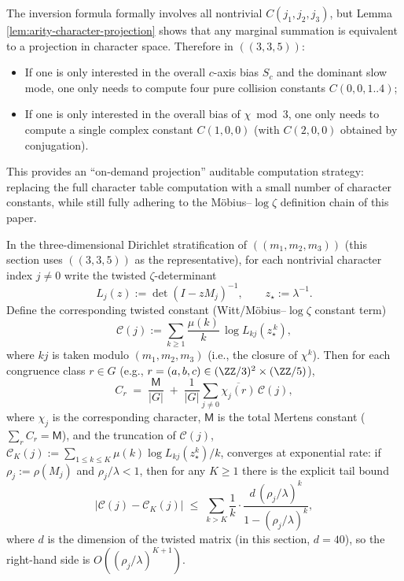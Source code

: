 \begin{remark}\label{rem:arity-335-projection-compression}
The inversion formula formally involves all nontrivial \(C(j_1,j_2,j_3)\), but Lemma \ref{lem:arity-character-projection} shows that any marginal summation is equivalent to a projection in character space.
Therefore in \(((3,3,5))\):
\begin{itemize}
  \item If one is only interested in the overall \(c\)-axis bias \(S_c\) and the dominant slow mode, one only needs to compute four pure collision constants \(C(0,0,1..4)\);
  \item If one is only interested in the overall bias of \(\chi\bmod 3\), one only needs to compute a single complex constant \(C(1,0,0)\) (with \(C(2,0,0)\) obtained by conjugation).
\end{itemize}
This provides an ``on-demand projection'' auditable computation strategy: replacing the full character table computation with a small number of character constants, while still fully adhering to the M\"{o}bius--\(\log\zeta\) definition chain of this paper.
\end{remark}

\begin{remark}\label{thm:arity-dirichlet-explicit-constant}
In the three-dimensional Dirichlet stratification of \(((m_1,m_2,m_3))\) (this section uses \(((3,3,5))\) as the representative), for each nontrivial character index \(j\neq 0\) write the twisted \(\zeta\)-determinant
\[
L_j(z):=\det(I-zM_j)^{-1},
\qquad
z_\star:=\lambda^{-1}.
\]
Define the corresponding twisted constant (Witt/M\"{o}bius--\(\log\zeta\) constant term)
\[
\mathcal{C}(j):=\sum_{k\ge 1}\frac{\mu(k)}{k}\,\log L_{kj}\!\left(z_\star^{\,k}\right),
\]
where \(kj\) is taken modulo \((m_1,m_2,m_3)\) (i.e., the closure of \(\chi^{k}\)). Then for each congruence class \(r\in G\) (e.g., \(r=(a,b,c)\in(\ZZ/3)^2\times(\ZZ/5)\)),
\[
C_r
\;=\;
\frac{\mathsf{M}}{|G|}
\;+\;
\frac{1}{|G|}\sum_{j\neq 0}\overline{\chi_j(r)}\,\mathcal{C}(j),
\]
where \(\chi_j\) is the corresponding character, \(\mathsf{M}\) is the total Mertens constant (\(\sum_r C_r=\mathsf{M}\)), and the truncation of \(\mathcal{C}(j)\),
\(
\mathcal{C}_K(j):=\sum_{1\le k\le K}\mu(k)\log L_{kj}(z_\star^k)/k
\),
converges at exponential rate: if \(\rho_j:=\rho(M_j)\) and \(\rho_j/\lambda<1\), then for any \(K\ge 1\) there is the explicit tail bound
\[
\left|\mathcal{C}(j)-\mathcal{C}_K(j)\right|
\;\le\;
\sum_{k>K}\frac{1}{k}\cdot
\frac{d\,(\rho_j/\lambda)^k}{1-(\rho_j/\lambda)^k},
\]
where \(d\) is the dimension of the twisted matrix (in this section, \(d=40\)), so the right-hand side is \(O((\rho_j/\lambda)^{K+1})\).
\end{remark}


